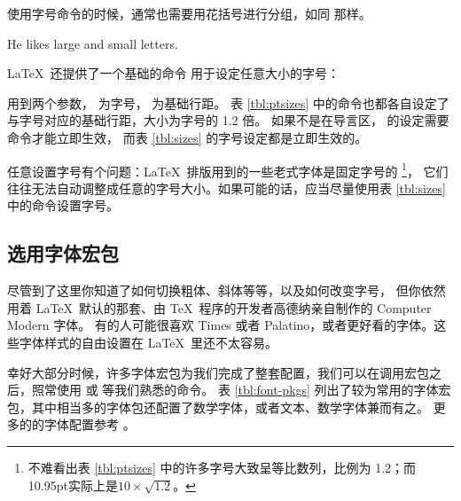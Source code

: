 使用字号命令的时候，通常也需要用花括号进行分组，如同  那样。

\begin{example}
He likes {\LARGE large and
{\small small} letters}.
\end{example}

\LaTeX\ 还提供了一个基础的命令  用于设定任意大小的字号：
\begin{command}
\end{command}

 用到两个参数， 为字号， 为基础行距。
表 \ref{tbl:ptsizes} 中的命令也都各自设定了与字号对应的基础行距，大小为字号的 1.2 倍。
如果不是在导言区， 的设定需要  命令才能立即生效，
而表 \ref{tbl:sizes} 的字号设定都是立即生效的。

任意设置字号有个问题：\LaTeX\ 排版用到的一些老式字体是固定字号的%
\footnote{不难看出表 \ref{tbl:ptsizes} 中的许多字号大致呈等比数列，比例为 1.2；而10.95pt实际上是$10\times\sqrt{1.2}$。}，
它们往往无法自动调整成任意的字号大小。如果可能的话，应当尽量使用表 \ref{tbl:sizes} 中的命令设置字号。

\subsection{选用字体宏包}\label{subsec:font-pkgs}

尽管到了这里你知道了如何切换粗体、斜体等等，以及如何改变字号，
但你依然用着 \LaTeX\ 默认的那套、由 \TeX\ 程序的开发者高德纳亲自制作的 Computer Modern 字体。
有的人可能很喜欢 Times 或者 Palatino，或者更好看的字体。这些字体样式的自由设置在 \LaTeX\ 里还不太容易。

幸好大部分时候，许多字体宏包为我们完成了整套配置，我们可以在调用宏包之后，照常使用  或  等我们熟悉的命令。
表 \ref{tbl:font-pkgs} 列出了较为常用的字体宏包，其中相当多的字体包还配置了数学字体，或者文本、数学字体兼而有之。
更多的的字体配置参考 \cite{survey,fontcatalogue}。


